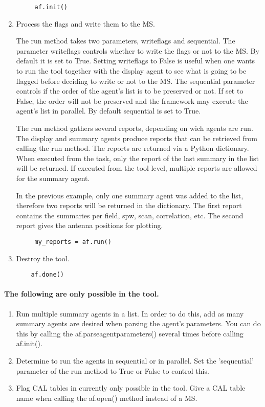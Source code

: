 \begin{enumerate}
\begin{verbatim}
     af.init()
\end{verbatim}

\item Process the flags and write them to the MS.

The run method takes two parameters, writeflags and sequential.
The parameter writeflags controls whether to write the flags or not to the MS.
By default it is set to True. Setting writeflags to False is useful when one
wants to run the tool together with the display agent to see what is going to be
flagged before deciding to write or not to the MS. The sequential parameter
controls if the order of the agent's list is to be preserved or not. If set to
False, the order will not be preserved and the framework may execute the agent's list in parallel.
By default sequential is set to True.

The run method gathers several reports, depending on wich agents are run. The display and summary agents
produce reports that can be retrieved from calling the run method. The reports are returned via a Python
dictionary. When executed from the task, only the report of the
last summary in the list will be returned. If executed from the tool level,
multiple reports are allowed for the summary agent.

In the previous example, only one summary agent was added to the list, therefore
two reports will be returned in the dictionary. The first report contains the
summaries per field, spw, scan, correlation, etc. The second report
gives the antenna positions for plotting.

\begin{verbatim}
     my_reports = af.run()
\end{verbatim}

\item Destroy the tool.

\begin{verbatim}
    af.done()
\end{verbatim}
 \end{enumerate}
 
\paragraph{The following are only possible in the tool.}
\begin{enumerate}

\item Run multiple summary agents in a list. In order to do this, add as many
summary agents are desired when parsing the agent's parameters. You can do this by
calling the af.parseagentparameters() several times before calling af.init().

\item Determine to run the agents in sequential or in parallel. Set the
'sequential' parameter of the run method to True or False to control this.

\item Flag CAL tables in currently only possible in the tool. Give a CAL table
name when calling the af.open() method instead of a MS.

\end{enumerate}

